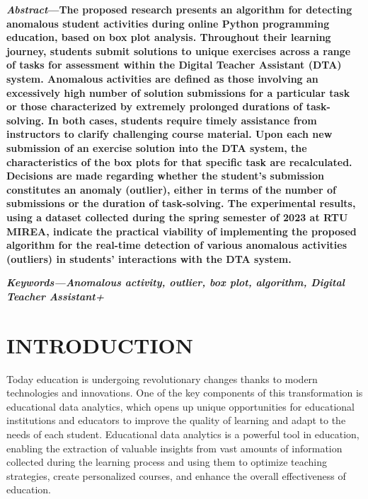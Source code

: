 \documentclass[letterpaper]{article}
\begin{document}
\begin{multicols}{2}
  \begin{justify}
    \begin{small}
      \textbf{
        \textit{Abstract}---The proposed research presents an algorithm for detecting anomalous student activities during online Python programming education, based on box plot analysis. Throughout their learning journey, students submit solutions to unique exercises across a range of tasks for assessment within the Digital Teacher Assistant (DTA) system. Anomalous activities are defined as those involving an excessively high number of solution submissions for a particular task or those characterized by extremely prolonged durations of task-solving. In both cases, students require timely assistance from instructors to clarify challenging course material. Upon each new submission of an exercise solution into the DTA system, the characteristics of the box plots for that specific task are recalculated. Decisions are made regarding whether the student's submission constitutes an anomaly (outlier), either in terms of the number of submissions or the duration of task-solving. The experimental results, using a dataset collected during the spring semester of 2023 at RTU MIREA, indicate the practical viability of implementing the proposed algorithm for the real-time detection of various anomalous activities (outliers) in students' interactions with the DTA system.
      }

      \textbf{
        \textit{Keywords---Anomalous activity, outlier, box plot, algorithm, Digital Teacher Assistant+}
      }
      \end{small}

      \section{INTRODUCTION}
      Today education is undergoing revolutionary changes thanks to modern technologies and innovations. One of the key components of this transformation is educational data analytics, which opens up unique opportunities for educational institutions and educators to improve the quality of learning and adapt to the needs of each student. Educational data analytics is a powerful tool in education, enabling the extraction of valuable insights from vast amounts of information collected during the learning process and using them to optimize teaching strategies, create personalized courses, and enhance the overall effectiveness of education.
      

\end{justify}
\end{multicols}
\end{document}
